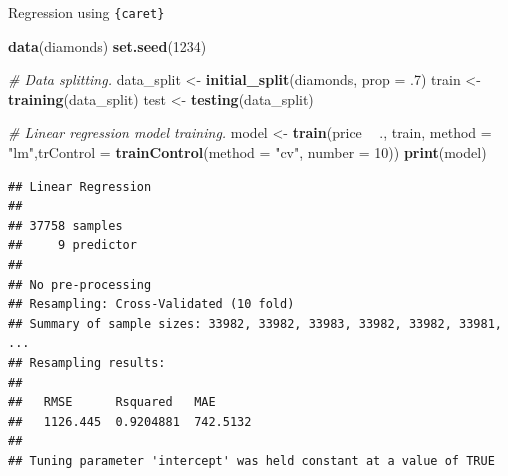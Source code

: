 \documentclass[12pt,ignorenonframetext,]{beamer}
\newenvironment{Shaded}{\begin{snugshade}}{\end{snugshade}}
\newcommand{\CommentTok}[1]{\textcolor[rgb]{0.56,0.35,0.01}{\textit{#1}}}
\newcommand{\DataTypeTok}[1]{\textcolor[rgb]{0.13,0.29,0.53}{#1}}
\newcommand{\DecValTok}[1]{\textcolor[rgb]{0.00,0.00,0.81}{#1}}
\newcommand{\FloatTok}[1]{\textcolor[rgb]{0.00,0.00,0.81}{#1}}
\newcommand{\KeywordTok}[1]{\textcolor[rgb]{0.13,0.29,0.53}{\textbf{#1}}}
\newcommand{\NormalTok}[1]{#1}
\newcommand{\OperatorTok}[1]{\textcolor[rgb]{0.81,0.36,0.00}{\textbf{#1}}}
\newcommand{\StringTok}[1]{\textcolor[rgb]{0.31,0.60,0.02}{#1}}
\begin{document}
\begin{frame}[fragile]{Regression using \texttt{\{caret\}}}
\protect\hypertarget{regression-using}{}

\tiny

\begin{Shaded}
\begin{Highlighting}[]
\KeywordTok{data}\NormalTok{(diamonds)}
\KeywordTok{set.seed}\NormalTok{(}\DecValTok{1234}\NormalTok{)}

\CommentTok{# Data splitting.}
\NormalTok{data_split <-}\StringTok{ }\KeywordTok{initial_split}\NormalTok{(diamonds, }\DataTypeTok{prop =} \FloatTok{.7}\NormalTok{)}
\NormalTok{train <-}\StringTok{ }\KeywordTok{training}\NormalTok{(data_split)}
\NormalTok{test  <-}\StringTok{ }\KeywordTok{testing}\NormalTok{(data_split)}

\CommentTok{# Linear regression model training.}
\NormalTok{model <-}\StringTok{ }\KeywordTok{train}\NormalTok{(price }\OperatorTok{~}\StringTok{ }\NormalTok{., train, }\DataTypeTok{method =} \StringTok{"lm"}\NormalTok{,}\DataTypeTok{trControl =} \KeywordTok{trainControl}\NormalTok{(}\DataTypeTok{method =} \StringTok{"cv"}\NormalTok{,}
                                        \DataTypeTok{number =} \DecValTok{10}\NormalTok{))}
\KeywordTok{print}\NormalTok{(model)}
\end{Highlighting}
\end{Shaded}

\begin{verbatim}
## Linear Regression 
## 
## 37758 samples
##     9 predictor
## 
## No pre-processing
## Resampling: Cross-Validated (10 fold) 
## Summary of sample sizes: 33982, 33982, 33983, 33982, 33982, 33981, ... 
## Resampling results:
## 
##   RMSE      Rsquared   MAE     
##   1126.445  0.9204881  742.5132
## 
## Tuning parameter 'intercept' was held constant at a value of TRUE
\end{verbatim}

\normalsize

\end{frame}
\end{document}
